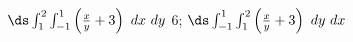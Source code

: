 {$\ds \int_1^2\int_{-1}^1\left(\frac xy+3\right)\ dx\ dy$
}
{6; $\ds \int_{-1}^1\int_{1}^2\left(\frac xy+3\right)\ dy\ dx$
}
